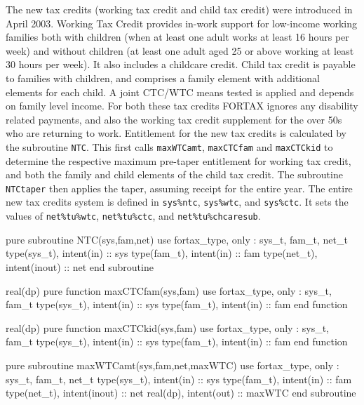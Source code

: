\documentclass[11pt,thmsa,letter,ukenglish]{article}
\begin{document}
The new tax credits (working tax credit and child tax credit) were introduced in April 2003. Working Tax Credit provides in-work support for low-income working families both with children (when at least one adult works at least 16 hours per week) and without children (at least one adult aged 25 or above working at least 30 hours per week). It also includes a childcare credit. Child tax credit is payable to families with children, and comprises a family element with additional elements for each child. A joint CTC/WTC means tested is applied and depends on family level income. For both these tax credits FORTAX ignores any disability related payments, and also the working tax credit supplement for the over 50s who are returning to work. Entitlement for the new tax credits is calculated by the subroutine \texttt{NTC}. This first calls \texttt{maxWTCamt}, \texttt{maxCTCfam} and \texttt{maxCTCkid} to determine the respective maximum pre-taper entitlement for working tax credit, and both the family and child elements of the child tax credit. The subroutine \texttt{NTCtaper} then applies the taper, assuming receipt for the entire year. The entire new tax credits system is defined in \texttt{sys\%ntc}, \texttt{sys\%wtc}, and \texttt{sys\%ctc}. It sets the values of \texttt{net\%tu\%wtc}, \texttt{net\%tu\%ctc}, and \texttt{net\%tu\%chcaresub}.

\begin{fortrancode}
pure subroutine NTC(sys,fam,net)
    use fortax_type, only : sys_t, fam_t, net_t
    type(sys_t), intent(in)    :: sys
    type(fam_t), intent(in)    :: fam
    type(net_t), intent(inout) :: net
end subroutine
\end{fortrancode}

\begin{fortrancode}
real(dp) pure function maxCTCfam(sys,fam)
    use fortax_type, only : sys_t, fam_t
    type(sys_t), intent(in) :: sys
    type(fam_t), intent(in) :: fam
end function
\end{fortrancode}

\begin{fortrancode}
real(dp) pure function maxCTCkid(sys,fam)
    use fortax_type, only : sys_t, fam_t
    type(sys_t), intent(in) :: sys
    type(fam_t), intent(in) :: fam
end function
\end{fortrancode}

\begin{fortrancode}
pure subroutine maxWTCamt(sys,fam,net,maxWTC)
    use fortax_type, only : sys_t, fam_t, net_t
    type(sys_t), intent(in)    :: sys
    type(fam_t), intent(in)    :: fam
    type(net_t), intent(inout) :: net
    real(dp),    intent(out)   :: maxWTC
end subroutine
\end{fortrancode}
\end{document}
